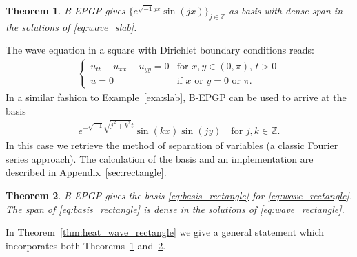 \documentclass{article} %
\theoremstyle{plain}
\newtheorem{theorem}{Theorem}[section]
\theoremstyle{definition}
\theoremstyle{remark}
\newenvironment{example}
  {\pushQED{\qed}\renewcommand{\qedsymbol}{$\triangle$}\examplex}
  {\popQED\endexamplex}
\begin{document}
\begin{theorem}\label{thm:slab}
    B-EPGP gives  $\{e^{\sqrt{-1}jx}\sin(jx)\}_{j\in\mathbb Z}$ as  basis with dense span in the solutions of \eqref{eq:wave_slab}.
\end{theorem}
\begin{example}[Rectangle]\label{exa:2-D_wave_rectangle}
    The wave equation in a square with Dirichlet boundary conditions reads:
    \begin{align}\label{eq:wave_rectangle}
    \begin{cases}
                u_{tt}-u_{xx}-u_{yy}=0&\text{for }x,y\in(0,\pi),\,t>0\\
        u=0&\text{if $x$ or $y=0$ or $\pi$.}
    \end{cases}
    \end{align}
    In a similar fashion to Example~\ref{exa:slab}, B-EPGP can be used to arrive at the basis
\begin{align}\label{eq:basis_rectangle}
 e^{\pm \sqrt{-1}\sqrt{j^2+k^2} t}\sin(k x)\sin(j y)\quad\text{for $j,k\in\mathbb Z$.}
\end{align}
In this case we retrieve the method of separation of variables (a classic Fourier series approach). The calculation of the basis and an implementation are described in Appendix~\ref{sec:rectangle}.
\end{example}
\begin{theorem}\label{thm:wave_rectangle}
    B-EPGP gives the basis \eqref{eq:basis_rectangle} for \eqref{eq:wave_rectangle}. The span of \eqref{eq:basis_rectangle} is dense in the solutions of \eqref{eq:wave_rectangle}.
\end{theorem}
In Theorem~\ref{thm:heat_wave_rectangle} we  give a general statement which incorporates both Theorems~\ref{thm:slab} and~\ref{thm:wave_rectangle}.
\end{document}
